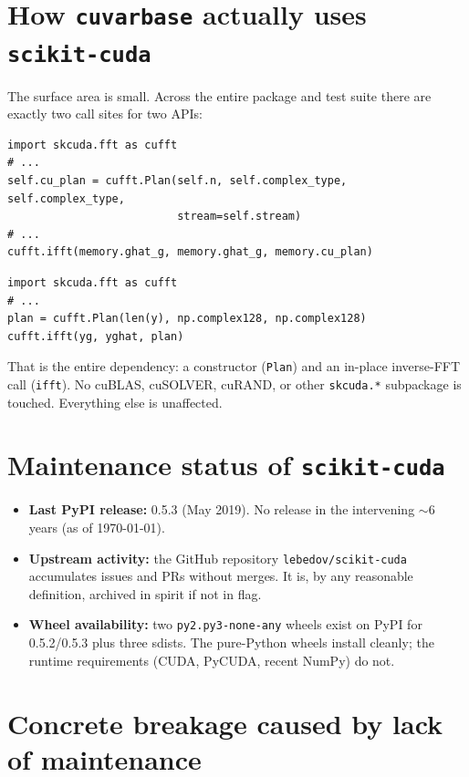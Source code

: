 \documentclass[11pt,a4paper]{article}
\begin{document}
\section{How \texttt{cuvarbase} actually uses \texttt{scikit-cuda}}

The surface area is small. Across the entire package and test suite there are
exactly two call sites for two APIs:

\begin{lstlisting}[language=pyplus,caption={\texttt{src/cuvarbase/cunfft.py}}]
import skcuda.fft as cufft
# ...
self.cu_plan = cufft.Plan(self.n, self.complex_type, self.complex_type,
                          stream=self.stream)
# ...
cufft.ifft(memory.ghat_g, memory.ghat_g, memory.cu_plan)
\end{lstlisting}

\begin{lstlisting}[language=pyplus,caption={\texttt{tests/test\_nfft.py}}]
import skcuda.fft as cufft
# ...
plan = cufft.Plan(len(y), np.complex128, np.complex128)
cufft.ifft(yg, yghat, plan)
\end{lstlisting}

That is the entire dependency: a constructor (\texttt{Plan}) and an in-place
inverse-FFT call (\texttt{ifft}). No cuBLAS, cuSOLVER, cuRAND, or other
\texttt{skcuda.*} subpackage is touched. Everything else is unaffected.

\section{Maintenance status of \texttt{scikit-cuda}}

\begin{itemize}[leftmargin=1.4em]
    \item \textbf{Last PyPI release:} 0.5.3 (May 2019). No release in the
    intervening $\sim$6 years (as of \today).
    \item \textbf{Upstream activity:} the GitHub repository
    \texttt{lebedov/scikit-cuda} accumulates issues and PRs without merges. It
    is, by any reasonable definition, archived in spirit if not in flag.
    \item \textbf{Wheel availability:} two \texttt{py2.py3-none-any} wheels
    exist on PyPI for 0.5.2/0.5.3 plus three sdists. The pure-Python wheels
    install cleanly; the runtime requirements (CUDA, PyCUDA, recent NumPy) do
    not.
\end{itemize}

\section{Concrete breakage caused by lack of maintenance}
\end{document}
